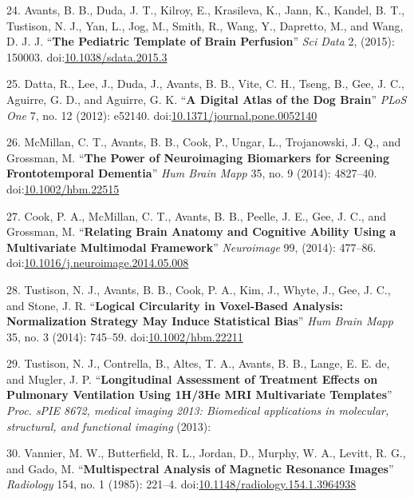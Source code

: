 \documentclass[11pt,]{article}
\begin{document}
\hypertarget{ref-Avants:2015aa}{}
24. Avants, B. B., Duda, J. T., Kilroy, E., Krasileva, K., Jann, K.,
Kandel, B. T., Tustison, N. J., Yan, L., Jog, M., Smith, R., Wang, Y.,
Dapretto, M., and Wang, D. J. J. ``\textbf{The Pediatric Template of
Brain Perfusion}'' \emph{Sci Data} 2, (2015): 150003.
doi:\href{https://doi.org/10.1038/sdata.2015.3}{10.1038/sdata.2015.3}

\hypertarget{ref-Datta:2012aa}{}
25. Datta, R., Lee, J., Duda, J., Avants, B. B., Vite, C. H., Tseng, B.,
Gee, J. C., Aguirre, G. D., and Aguirre, G. K. ``\textbf{A Digital Atlas
of the Dog Brain}'' \emph{PLoS One} 7, no. 12 (2012): e52140.
doi:\href{https://doi.org/10.1371/journal.pone.0052140}{10.1371/journal.pone.0052140}

\hypertarget{ref-McMillan:2014aa}{}
26. McMillan, C. T., Avants, B. B., Cook, P., Ungar, L., Trojanowski, J.
Q., and Grossman, M. ``\textbf{The Power of Neuroimaging Biomarkers for
Screening Frontotemporal Dementia}'' \emph{Hum Brain Mapp} 35, no. 9
(2014): 4827--40.
doi:\href{https://doi.org/10.1002/hbm.22515}{10.1002/hbm.22515}

\hypertarget{ref-Cook:2014aa}{}
27. Cook, P. A., McMillan, C. T., Avants, B. B., Peelle, J. E., Gee, J.
C., and Grossman, M. ``\textbf{Relating Brain Anatomy and Cognitive
Ability Using a Multivariate Multimodal Framework}'' \emph{Neuroimage}
99, (2014): 477--86.
doi:\href{https://doi.org/10.1016/j.neuroimage.2014.05.008}{10.1016/j.neuroimage.2014.05.008}

\hypertarget{ref-Tustison:2014ad}{}
28. Tustison, N. J., Avants, B. B., Cook, P. A., Kim, J., Whyte, J.,
Gee, J. C., and Stone, J. R. ``\textbf{Logical Circularity in
Voxel-Based Analysis: Normalization Strategy May Induce Statistical
Bias}'' \emph{Hum Brain Mapp} 35, no. 3 (2014): 745--59.
doi:\href{https://doi.org/10.1002/hbm.22211}{10.1002/hbm.22211}

\hypertarget{ref-Tustison:2013ad}{}
29. Tustison, N. J., Contrella, B., Altes, T. A., Avants, B. B., Lange,
E. E. de, and Mugler, J. P. ``\textbf{Longitudinal Assessment of
Treatment Effects on Pulmonary Ventilation Using 1H/3He MRI Multivariate
Templates}'' \emph{Proc. sPIE 8672, medical imaging 2013: Biomedical
applications in molecular, structural, and functional imaging} (2013):

\hypertarget{ref-Vannier:1985aa}{}
30. Vannier, M. W., Butterfield, R. L., Jordan, D., Murphy, W. A.,
Levitt, R. G., and Gado, M. ``\textbf{Multispectral Analysis of Magnetic
Resonance Images}'' \emph{Radiology} 154, no. 1 (1985): 221--4.
doi:\href{https://doi.org/10.1148/radiology.154.1.3964938}{10.1148/radiology.154.1.3964938}
\end{document}
